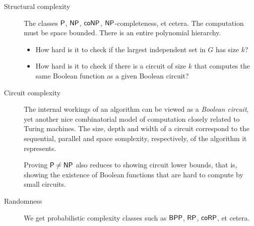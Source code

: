 \begin{description}
    \item[Structural complexity] The classes $\P$, $\NP$, $\coNP$,
        $\NP$-completeness, et cetera.
        The computation must be space bounded. 
        There is an entire polynomial hierarchy.
        \begin{itemize}
            \item How hard is it to check if the largest independent set in
                $G$ has size $k$?
            \item How hard is it to check if there is a circuit of size $k$
                that computes the same Boolean function as a given
                Boolean circuit?
        \end{itemize}
    \item[Circuit complexity] The internal workings of an algorithm can be
        viewed as a \emph{Boolean circuit}, yet another nice combinatorial
        model of computation closely related to Turing machines.
        The size, depth and width of a circuit correspond to the sequential,
        parallel and space somplexity, respectively, of the algorithm it
        represents.

        Proving $\P \ne \NP$ also reduces to showing circuit lower bounds,
        that is, showing the existence of Boolean functions that are hard to
        compute by small circuits.
    \item[Randomness] We get probabilistic complexity classes such as
        $\BPP$, $\RP$, $\coRP$, et cetera.


\end{description}
